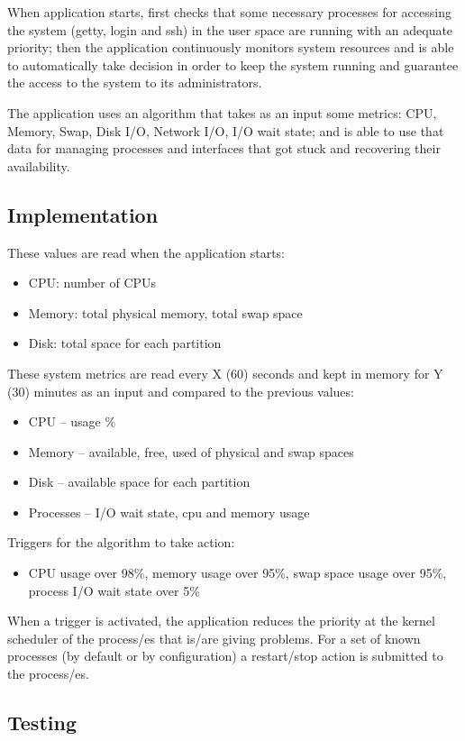 \documentclass[conference]{IEEEtran}
\begin{document}
When application starts, first checks that some necessary processes for accessing the system (getty, login and ssh) in the user space are running with an adequate priority; then the application continuously monitors system resources and is able to automatically take decision in order to keep the system running and guarantee the access to the system to its administrators.

The application uses an algorithm that takes as an input some metrics: CPU, Memory, Swap, Disk I/O, Network I/O, I/O wait state; and is able to use that data for managing processes and interfaces that got stuck and recovering their availability.

\subsection{Implementation}
These values are read when the application starts:
\begin{itemize}
\item CPU: number of CPUs
\item Memory: total physical memory, total swap space
\item Disk: total space for each partition
\end{itemize}
These system metrics are read every X (60) seconds and kept in memory for Y (30) minutes as an input and compared to the previous values:
\begin{itemize}
\item CPU – usage \%
\item Memory – available, free, used of physical and swap spaces
\item Disk – available space for each partition
\item Processes – I/O wait state, cpu and memory usage
\end{itemize}
Triggers for the algorithm to take action:
\begin{itemize}
\item CPU usage over 98\%, memory usage over 95\%, swap space usage over 95\%, process I/O wait state over 5\%
\end{itemize}
When a trigger is activated, the application reduces the priority at the kernel scheduler of the process/es that is/are giving problems. For a set of known processes (by default or by configuration) a restart/stop action is submitted to the process/es.

\subsection{Testing}
\end{document}
